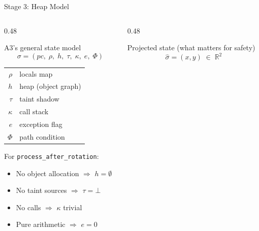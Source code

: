 \documentclass[aspectratio=169]{beamer}
\begin{document}
\begin{frame}{Stage 3: Heap Model}
\begin{columns}[T]
\begin{column}{0.48\textwidth}
\begin{block}{A3's general state model}
\vspace{-0.3em}
\[
  \sigma = (\mathit{pc},\;\rho,\;h,\;\tau,\;\kappa,\;e,\;\Phi)
\]
\footnotesize
\begin{tabular}{@{}rl@{}}
  $\rho$ & locals map \\
  $h$    & heap (object graph) \\
  $\tau$ & taint shadow \\
  $\kappa$ & call stack \\
  $e$    & exception flag \\
  $\Phi$ & path condition \\
\end{tabular}
\end{block}

\vspace{0.3em}
For \texttt{process\_after\_rotation}:
\begin{itemize}
  \item No object allocation $\Rightarrow$ $h = \emptyset$
  \item No taint sources $\Rightarrow$ $\tau = \bot$
  \item No calls $\Rightarrow$ $\kappa$ trivial
  \item Pure arithmetic $\Rightarrow$ $e = 0$
\end{itemize}
\end{column}
\begin{column}{0.48\textwidth}
\begin{block}{Projected state (what matters for safety)}
\vspace{-0.3em}
\[
  \hat\sigma = (x, y) \;\in\; \mathbb{R}^2
\]
\end{block}

\vspace{0.3em}
\begin{center}
\end{center}
\end{column}
\end{columns}
\end{frame}
\end{document}
